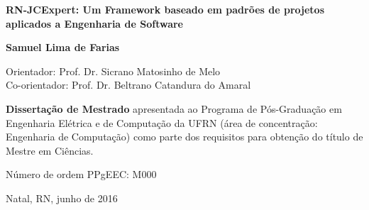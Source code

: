 \begin{titlepage}
\begin{center}
\vfill

\LARGE

\textbf{RN-JCExpert: Um Framework baseado em padrões de projetos aplicados a Engenharia de Software}

\vfill

\Large

\textbf{Samuel Lima de Farias}

\vfill

\normalsize

Orientador: Prof. Dr. Sicrano Matosinho de Melo
\\[2ex] Co-orientador: Prof. Dr. Beltrano Catandura do Amaral

\vfill

\hfill
\parbox{0.5\linewidth}{\textbf{%
Dissertação de Mestrado}
apresentada ao Programa de Pós-Graduação em Engenharia Elétrica e de Computação da UFRN
(área de concentração: Engenharia de Computação)
como parte dos requisitos para obtenção do título de
Mestre em Ciências.}

\vfill

\large

Número de ordem PPgEEC: M000

Natal, RN, junho de 2016

\end{center}

\end{titlepage}
